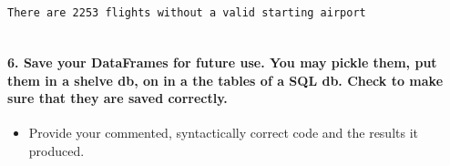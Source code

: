 \documentclass[11pt]{article}
\providecommand{\tightlist}{%
      \setlength{\itemsep}{0pt}\setlength{\parskip}{0pt}}
\begin{document}
    \begin{Verbatim}[commandchars=\\\{\}]
There are 2253 flights without a valid starting airport 


    \end{Verbatim}

    \paragraph{6. Save your DataFrames for future use. You may pickle them,
put them in a shelve db, on in a the tables of a SQL db. Check to make
sure that they are saved
correctly.}\label{save-your-dataframes-for-future-use.-you-may-pickle-them-put-them-in-a-shelve-db-on-in-a-the-tables-of-a-sql-db.-check-to-make-sure-that-they-are-saved-correctly.}

\begin{itemize}
\tightlist
\item
  Provide your commented, syntactically correct code and the results it
  produced.
\end{itemize}
\end{document}
